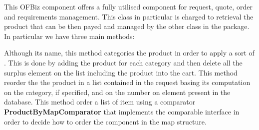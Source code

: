 This OFBiz component offers a fully utilised component for request, quote, order and requirements management.
This class in particular is charged to retrieval the product that can be then payed and managed by the other class in the
package.
In particular we have three main methods:
\begin{itemize}
  Although its name, this method categories the product in order to
  apply a sort of . This is done by adding the product for
  each category and then delete all the surplus element on the list including the product into the cart.
  This method reorder the the product in a list contained in the request basing its computation
  on the category, if specified, and on the number on element present in the database.
  This method order a list of item using a comparator \textbf{ProductByMapComparator} that implements the comparable interface
  in order to decide how to order the component in the map structure.
\end{itemize}
